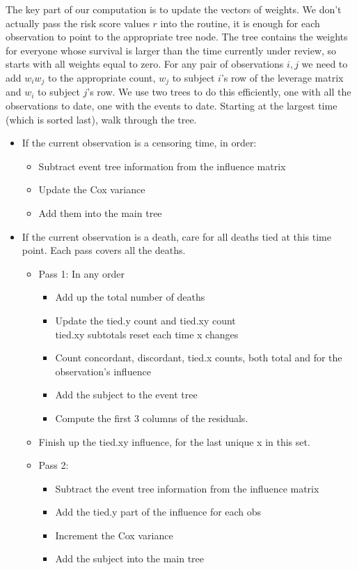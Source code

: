 \documentclass{article}
\begin{document}
The key part of our computation is to update the vectors of weights.
We don't actually pass the risk score values $r$ into the routine,   %
it is enough for each observation to point to the appropriate tree
node.
The tree contains the weights for everyone whose survival is larger
than the time currently under review, so starts with all weights
equal to zero.  
For any pair of observations $i,j$ we need to add $w_iw_j$
to the appropriate count, $w_j$ to subject $i$'s row of the leverage
matrix and $w_i$ to subject $j$'s row.  We use two trees to do this 
efficiently, one with all the observations to date, one with the events to
date.
Starting at the largest time (which is sorted last), walk through the tree.
\begin{itemize}
  \item If the current observation is a censoring time, in order:
    \begin{itemize}
      \item Subtract event tree information from the influence matrix
      \item Update the Cox variance
      \item Add them into the main tree
    \end{itemize}
  \item If the current observation is a death, care for all deaths tied
    at this time point.  Each pass covers all the deaths.
    \begin{itemize}
      \item Pass 1: In any order
        \begin{itemize}
          \item Add up the total number of deaths
          \item Update the tied.y count and tied.xy count \\
            tied.xy subtotals reset each time x changes
          \item Count concordant, discordant, tied.x counts, both total
            and for the observation's influence
          \item Add the subject to the event tree
          \item Compute the first 3 columns of the residuals.
        \end{itemize}
      \item Finish up the tied.xy influence, for the last unique x in this set.
      \item Pass 2: 
        \begin{itemize}
          \item Subtract the event tree information from the influence matrix
          \item Add the tied.y part of the influence for each obs
          \item Increment the Cox variance
          \item Add the subject into the main tree
        \end{itemize}
    \end{itemize}


\end{itemize}
\end{document}
